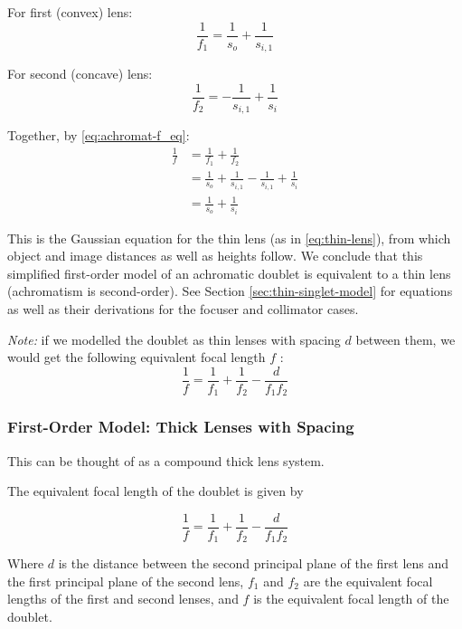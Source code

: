 For first (convex) lens:
\begin{equation}
    \frac{1}{f_1} = \frac{1}{s_o} + \frac{1}{s_{i,1}}
\end{equation}

For second (concave) lens:
\begin{equation}
    \frac{1}{f_2} = -\frac{1}{s_{i,1}} + \frac{1}{s_i}
\end{equation}

Together, by \eqref{eq:achromat-f_eq}:
\begin{align}
    \frac{1}{f} &= \frac{1}{f_1} + \frac{1}{f_2} \\
    &= \frac{1}{s_o} + \frac{1}{s_{i,1}} - \frac{1}{s_{i,1}} + \frac{1}{s_i} \\
    &= \frac{1}{s_o} + \frac{1}{s_i}
\end{align}

This is the Gaussian equation for the thin lens (as in \eqref{eq:thin-lens}), from which object and image distances as well as heights follow. We conclude that this simplified first-order model of an achromatic doublet is equivalent to a thin lens (achromatism is second-order). See Section \ref{sec:thin-singlet-model} for equations as well as their derivations for the focuser and collimator cases.

\textit{Note:} if we modelled the doublet as thin lenses with spacing $d$ between them, we would get the following equivalent focal length $f$ \cite{Boundless_undated-to}:
\begin{equation}
    \frac{1}{f} = \frac{1}{f_1} + \frac{1}{f_2} - \frac{d}{f_1 f_2}
\end{equation}
\textit{}

\subsubsection{First-Order Model: Thick Lenses with Spacing}

This can be thought of as a compound thick lens system.

The equivalent focal length of the doublet is given by \cite{Purdue-Lec32, Hecht-optics-6.1}

\begin{equation}
    \frac{1}{f} = \frac{1}{f_1} + \frac{1}{f_2} - \frac{d}{f_1 f_2}
\end{equation}

Where $d$ is the distance between the second principal plane of the first lens and the first principal plane of the second lens, $f_1$ and $f_2$ are the equivalent focal lengths of the first and second lenses, and $f$ is the equivalent focal length of the doublet.

